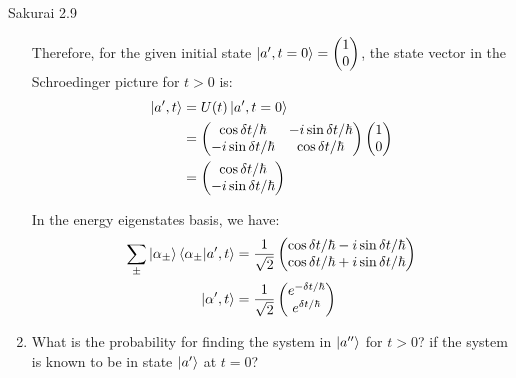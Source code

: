 \documentclass{article}
\begin{document}
\begin{section}{Sakurai 2.9}
\begin{enumerate}
\begin{tcolorbox}
		Therefore, for the given initial state $\ket{a', t=0} = \begin{pmatrix}
				1 \\ 0
			\end{pmatrix}$, the state vector in the Schroedinger picture for $t > 0$ is:
		\begin{align*}
			\ket{a', t} & = U(t) \ket{a', t=0}                                \\
			            & = \begin{pmatrix}
				                \cos{\delta t/\hbar}    & -i \sin{\delta t/\hbar} \\
				                -i \sin{\delta t/\hbar} & \cos{\delta t/\hbar}
			                \end{pmatrix}
			\begin{pmatrix}
				1 \\ 0
			\end{pmatrix}                                                    \\
			            & = \begin{pmatrix}
				                \cos{\delta t/\hbar} \\ -i \sin{\delta t/\hbar}
			                \end{pmatrix}
		\end{align*}

		In the energy eigenstates basis, we have:
		\begin{align*}
			\sum_{\pm} \ket{\alpha_{\pm}} \bra{\alpha_{\pm}}\ket{a', t}
			 & = \frac{1}{\sqrt 2} \begin{pmatrix}
				                       \cos \delta t/\hbar - i \sin \delta t/\hbar \\
				                       \cos \delta t/\hbar + i \sin \delta t/\hbar
			                       \end{pmatrix} \\
			\ket{\alpha', t}
			 & = \frac{1}{\sqrt 2} \begin{pmatrix}
				                       e^{-\delta t/\hbar} \\
				                       e^{\delta t/\hbar}
			                       \end{pmatrix}
		\end{align*}
	\end{tcolorbox}

	\item What is the probability for finding the system in $\ket{a''}$ for $t > 0$? if the system is known to be in state $\ket{a'}$ at $t=0$?


\end{enumerate}
\end{section}
\end{document}
